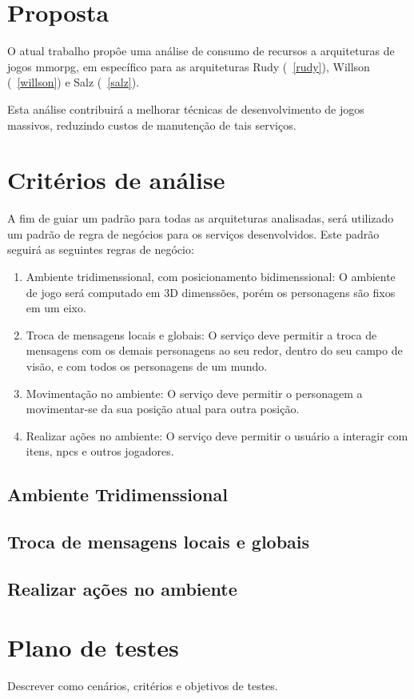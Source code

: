 \section{Proposta}

O atual trabalho propôe uma análise de consumo de recursos a arquiteturas de jogos \ac{mmorpg}, em específico para as arquiteturas Rudy (~\ref{rudy}), Willson (~\ref{willson}) e Salz (~\ref{salz}).

Esta análise contribuirá a melhorar técnicas de desenvolvimento de jogos massivos, reduzindo custos de manutenção de tais serviços.


\section{Critérios de análise}

A fim de guiar um padrão para todas as arquiteturas analisadas, será utilizado um padrão de regra de negócios para os serviços desenvolvidos.
%
Este padrão seguirá as seguintes regras de negócio:

\begin{enumerate}
  \item Ambiente tridimenssional, com posicionamento bidimenssional: O ambiente de jogo será computado em 3D dimenssões, porém os personagens são fixos em um eixo.
  \item Troca de mensagens locais e globais: O serviço deve permitir a troca de mensagens com os demais personagens ao seu redor, dentro do seu campo de visão, e com todos os personagens de um mundo.
  \item Movimentação no ambiente: O serviço deve permitir o personagem a movimentar-se da sua posição atual para outra posição.
  \item Realizar ações no ambiente: O serviço deve permitir o usuário a interagir com itens, \ac{npcs} e outros jogadores.
\end{enumerate}

\subsection{Ambiente Tridimenssional}
\subsection{Troca de mensagens locais e globais}
\subsection{Realizar ações no ambiente}

\section{Plano de testes}

Descrever como cenários, critérios e objetivos de testes.
